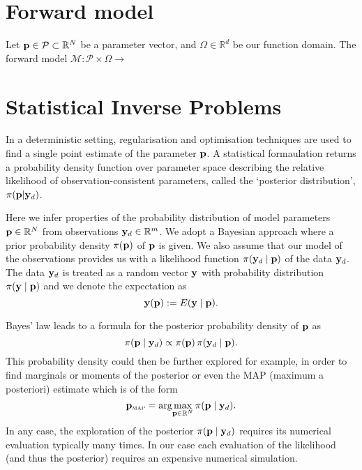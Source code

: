 \section{Forward model}
Let ${\mathbf{p}} \in \mathcal{P} \subset \mathbb{R}^N$ be a parameter vector, and $\Omega \in \mathbb{R}^d$ be our function domain. The forward model $\mathcal{M}: \mathcal{P}\times \Omega \rightarrow $

\section{Statistical Inverse Problems}
In a deterministic setting, regularisation and optimisation techniques are used to find a single point estimate of the parameter ${\mathbf{p}}$. A statistical formaulation returns a probability density function over parameter space describing the relative likelihood of observation-consistent parameters, called the `posterior distribution', $\pi({\mathbf{p}}| {\mathbf{y}}_d)$.

Here we infer properties of the probability distribution of model parameters ${\mathbf{p}}\in{\mathbb R}^N$ 
from observations ${\mathbf{y}}_d\in{\mathbb R}^m$. 
We adopt a Bayesian approach where a prior probability density $\pi({\mathbf{p}})$ of ${\mathbf{p}}$ is given. 
We also assume that our model of the observations provides us with
a likelihood function $\pi({\mathbf{y}}_d\mid {\mathbf{p}})$ of the data ${\mathbf{y}}_d$. 
The data ${\mathbf{y}}_d$ is treated as a random vector ${\mathbf{y}}$ with probability distribution $\pi({\mathbf{y}}\mid {\mathbf{p}})$ and we denote the expectation as
\begin{equation*}
{\mathbf{y}}({\mathbf{p}}) := E({\mathbf{y}}\mid {\mathbf{p}}).
\end{equation*}

Bayes' law leads to a formula for the posterior probability density of ${\mathbf{p}}$ as
\begin{equation}\label{eqn:bayes}
\pi({\mathbf{p}}\mid {\mathbf{y}}_d) \propto \pi({\mathbf{p}})\,\pi({\mathbf{y}}_d\mid {\mathbf{p}}).
\end{equation}
This probability density could then be further explored for example, in order to find marginals or
moments of the posterior or even the MAP (maximum a posteriori) estimate which is of the form
\begin{equation}\label{eqn:PMAPfull}
{\mathbf{p}}_{\operatorname{\textsc{map}}} = \arg\!\max_{{\mathbf{p}}\in{\mathbb R}^N} \pi({\mathbf{p}}\mid {\mathbf{y}}_d).
\end{equation}
In any case, the exploration of the posterior $\pi({\mathbf{p}}\mid {\mathbf{y}}_d)$ requires its numerical evaluation typically many times. 
In our case each evaluation of the likelihood (and thus the posterior) 
requires an expensive numerical simulation.


